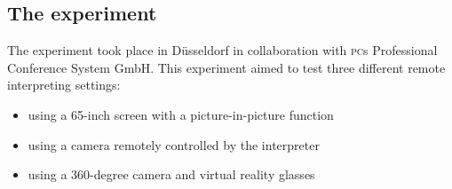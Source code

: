 \documentclass[output=paper]{langsci/langscibook}
\begin{document}
\subsection{The experiment}
\label{sub:ziegler:6.1}
The experiment took place in Düsseldorf in collaboration with \textsc{pc}s Professional Conference System GmbH. This experiment aimed to test three different remote interpreting settings: 

\begin{itemize}
\item using a 65-inch screen with a picture-in-picture function 
\item using a camera remotely controlled by the interpreter
\item using a 360-degree camera and virtual reality glasses 
\end{itemize}
\end{document}
